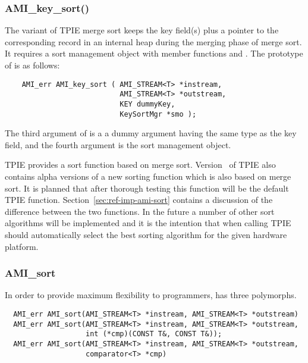 \subsubsection{AMI\_key\_sort()}

The  variant of TPIE merge sort keeps
the key field(s) plus a pointer to the corresponding record
in an internal heap during the merging phase of merge sort.
It requires a sort management object with member functions
 and . The prototype of
 is as follows:

\begin{verbatim}
    AMI_err AMI_key_sort ( AMI_STREAM<T> *instream, 
                           AMI_STREAM<T> *outstream, 
                           KEY dummyKey, 
                           KeySortMgr *smo );
\end{verbatim}

The third argument of  is a a
dummy argument having the same type as the key field, and
the fourth argument is the sort management
object.


TPIE provides a sort function  based on merge
sort. Version \version~of TPIE also contains alpha versions of a new
sorting function  which is also based on merge
sort. It is planned that after thorough testing this function will be the
default TPIE  function. Section~\ref{sec:ref-imp-ami-sort}
contains a discussion of the difference between the two functions. In the
future a number of other sort algorithms will be implemented and it is the
intention that when calling  TPIE should automatically
select the best sorting algorithm for the given hardware platform.

\subsubsection{AMI\_sort}

In order to provide maximum flexibility to programmers, 
has three polymorphs.
\begin{verbatim}
  AMI_err AMI_sort(AMI_STREAM<T> *instream, AMI_STREAM<T> *outstream)
  AMI_err AMI_sort(AMI_STREAM<T> *instream, AMI_STREAM<T> *outstream,
                   int (*cmp)(CONST T&, CONST T&));
  AMI_err AMI_sort(AMI_STREAM<T> *instream, AMI_STREAM<T> *outstream,
                   comparator<T> *cmp)
\end{verbatim}

